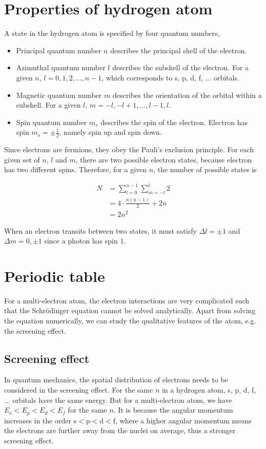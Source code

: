 \documentclass[12pt]{book} %
\numberwithin{equation}{chapter}
\def\D{\Delta}
\begin{document}
\section{Properties of hydrogen atom}
A state in the hydrogen atom is specified by four quantum numbers,
\begin{itembox}
\begin{itemize}
\item Principal quantum number $n$ describes the principal shell of the electron.
\item Azimuthal quantum number $l$ describes the subshell of the electron. For a given $n$, $l=0, 1, 2,\dots,n-1$, which corresponds to s, p, d, f, $\dots$ orbitals.
\item Magnetic quantum number $m$ describes the orientation of the orbital within a subshell. For a given $l$, $m=-l, -l+1, \dots, l-1, l$.
\item Spin quantum number $m_{s}$ describes the spin of the electron. Electron has spin $m_{s}=\pm\frac{1}{2}$, namely spin up and spin down.
\end{itemize}
\end{itembox}
Since electrons are fermions, they obey the Pauli's exclusion principle. For each given set of $n$, $l$ and $m$, there are two possible electron states, because electron has two different spins.\bigskip\newline
Therefore, for a given $n$, the number of possible states is
\begin{eqnbox}
\begin{align}
N&=\sum_{l=0}^{n-1}\sum_{m=-l}^{l}2\nonumber\\
&=4\cdot\frac{n(n-1)}{2}+2n\nonumber\\
&=2n^{2}
\end{align}
\end{eqnbox}
When an electron transits between two states, it must satisfy $\D l=\pm1$ and $\D m=0,\pm1$ since a photon has spin $1$.

\section{Periodic table}
For a multi-electron atom, the electron interactions are very complicated such that the Schr\"{o}dinger equation cannot be solved analytically. Apart from solving the equation numerically, we can study the qualitative features of the atom, e.g. the screening effect.

\subsection*{Screening effect}
In quantum mechanics, the spatial distribution of electrons needs to be considered in the screening effect. For the same $n$ in a hydrogen atom, s, p, d, f, $\dots$ orbitals have the same energy. But for a multi-electron atom, we have $E_{s}<E_{p}<E_{d}<E_{f}$ for the same $n$. It is because the angular momentum increases in the order $\text{s}<\text{p}<\text{d}<\text{f}$, where a higher angular momentum means the electrons are further away from the nuclei on average, thus a stronger screening effect.
\end{document}
